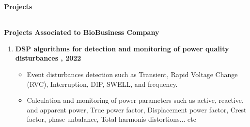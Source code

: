 \documentclass[a4paper,12pt,final]{memoir}
\newcommand{\SmallSep}{\vspace{0.5em}}
\newcommand{\CVSection}[1]
	{\Large\textbf{#1}\par
	\SmallSep\normalsize\normalfont}
\newcommand{\CVItem}[1]
	{\textbf{\color{RoyalBlue} #1}}
\begin{document}
\clearpage
\framebreak
\framebreak

\CVSection{Projects}\\
\CVItem{Projects Associated to BioBusiness Company}
\begin{enumerate}
\item \textbf{DSP algorithms for detection and monitoring of power quality disturbances , 2022} 
\begin{itemize}
\item Event disturbances detection such as Transient, Rapid Voltage Change (RVC), Interruption, DIP, SWELL, and frequency.
\item Calculation and monitoring of power parameters such as active, reactive, and apparent power, True power factor, Displacement power factor, Crest factor, phase unbalance, Total harmonis distortions... etc
\end{itemize}


\end{enumerate}
\end{document}
